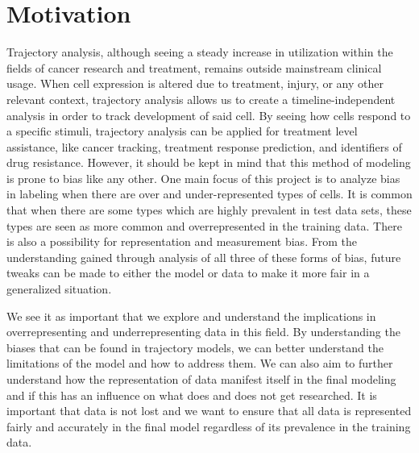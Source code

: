 \documentclass{article}
\begin{document}
\section{Motivation}
Trajectory analysis, although seeing a steady increase in utilization within the fields of cancer research and treatment, remains outside mainstream clinical usage. When cell expression is altered due to treatment, injury, or any other relevant context, trajectory analysis allows us to create a timeline-independent analysis in order to track development of said cell. By seeing how cells respond to a specific stimuli, trajectory analysis can be applied for treatment level assistance, like cancer tracking, treatment response prediction, and identifiers of drug resistance. However, it should be kept in mind that this method of modeling is prone to bias like any other. One main focus of this project is to analyze bias in labeling when there are over and under-represented types of cells. It is common that when there are some types which are highly prevalent in test data sets, these types are seen as more common and overrepresented in the training data. There is also a possibility for representation and measurement bias. From the understanding gained through analysis of all three of these forms of bias, future tweaks can be made to either the model or data to make it more fair in a generalized situation.

We see it as important that we explore and understand the implications in overrepresenting and underrepresenting data in this field. By understanding the biases that can be found in trajectory models, we can better understand the limitations of the model and how to address them. We can also aim to further understand how the representation of data manifest itself in the final modeling and if this has an influence on what does and does not get researched. It is important that data is not lost and we want to ensure that all data is represented fairly and accurately in the final model regardless of its prevalence in the training data.
\end{document}
